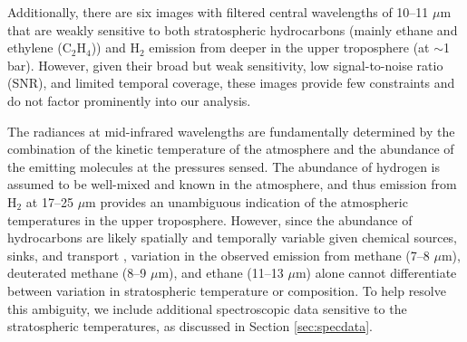 \documentclass[twocolumn,10pt]{aastex631}
\begin{document}
Additionally, there are six images with filtered central wavelengths of 10--11 $\mu$m that are weakly sensitive to both stratospheric hydrocarbons (mainly ethane and ethylene (C$_2$H$_4$)) and H$_2$ emission from deeper in the upper troposphere (at $\sim$1 bar).  However, given their broad but weak sensitivity, low signal-to-noise ratio (SNR), and limited temporal coverage, these images provide few constraints and do not factor prominently into our analysis. 


The radiances at mid-infrared wavelengths are fundamentally determined by the combination of the kinetic temperature of the atmosphere and the abundance of the emitting molecules at the pressures sensed. The abundance of hydrogen is assumed to be well-mixed and known in the atmosphere, and thus emission from H$_2$ at 17--25 $\mu$m provides an unambiguous indication of the atmospheric temperatures in the upper troposphere.  However, since the abundance of hydrocarbons are likely spatially and temporally variable given chemical sources, sinks, and transport \citep{moses2018seasonal,moses2020icegiantchem}, variation in the observed emission from methane (7--8 $\mu$m), deuterated methane (8--9 $\mu$m), and ethane (11--13 $\mu$m) alone cannot differentiate between variation in stratospheric temperature or composition.  To help resolve this ambiguity, we include additional spectroscopic data sensitive to the stratospheric temperatures, as discussed in Section \ref{sec:specdata}.
\end{document}
